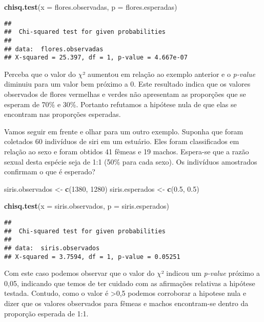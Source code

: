 \documentclass[14pt,titlepage, oneside, openany, a4paper]{book}
\newenvironment{Shaded}{\begin{snugshade}}{\end{snugshade}}
\newcommand{\DataTypeTok}[1]{\textcolor[rgb]{0.13,0.29,0.53}{#1}}
\newcommand{\DecValTok}[1]{\textcolor[rgb]{0.00,0.00,0.81}{#1}}
\newcommand{\FloatTok}[1]{\textcolor[rgb]{0.00,0.00,0.81}{#1}}
\newcommand{\KeywordTok}[1]{\textcolor[rgb]{0.13,0.29,0.53}{\textbf{#1}}}
\newcommand{\NormalTok}[1]{#1}
\newcommand{\StringTok}[1]{\textcolor[rgb]{0.31,0.60,0.02}{#1}}
\begin{document}
\begin{Shaded}
\begin{Highlighting}[]
\KeywordTok{chisq.test}\NormalTok{(}\DataTypeTok{x =}\NormalTok{ flores.observadas, }\DataTypeTok{p =}\NormalTok{ flores.esperadas)}
\end{Highlighting}
\end{Shaded}

\begin{verbatim}
## 
##  Chi-squared test for given probabilities
## 
## data:  flores.observadas
## X-squared = 25.397, df = 1, p-value = 4.667e-07
\end{verbatim}

Perceba que o valor do \(\chi\)² aumentou em relação ao exemplo anterior e o \emph{p-value} diminuiu para um valor bem próximo a 0. Este resultado indica que os valores observados de flores vermelhas e verdes não apresentam as proporções que se esperam de 70\% e 30\%. Portanto refutamos a hipótese nula de que elas se encontram nas proporções esperadas.

Vamos seguir em frente e olhar para um outro exemplo. Suponha que foram coletados 60 indivíduos de siri em um estuário. Eles foram classificados em relação ao sexo e foram obtidos 41 fêmeas e 19 machos. Espera-se que a razão sexual desta espécie seja de 1:1 (50\% para cada sexo). Os indivíduos amostrados confirmam o que é esperado?

\begin{Shaded}
\begin{Highlighting}[]
\NormalTok{siris.observados <-}\StringTok{ }\KeywordTok{c}\NormalTok{(}\DecValTok{1380}\NormalTok{, }\DecValTok{1280}\NormalTok{)}
\NormalTok{siris.esperados <-}\StringTok{ }\KeywordTok{c}\NormalTok{(}\FloatTok{0.5}\NormalTok{, }\FloatTok{0.5}\NormalTok{)}

\KeywordTok{chisq.test}\NormalTok{(}\DataTypeTok{x =}\NormalTok{ siris.observados, }\DataTypeTok{p =}\NormalTok{ siris.esperados)}
\end{Highlighting}
\end{Shaded}

\begin{verbatim}
## 
##  Chi-squared test for given probabilities
## 
## data:  siris.observados
## X-squared = 3.7594, df = 1, p-value = 0.05251
\end{verbatim}

Com este caso podemos observar que o valor do \(\chi\)² indicou um \emph{p-value} próximo a 0,05, indicando que temos de ter cuidado com as afirmações relativas a hipótese testada. Contudo, como o valor é \textgreater{}0,5 podemos corroborar a hipotese nula e dizer que os valores observados para fêmeas e machos encontram-se dentro da proporção esperada de 1:1.
\end{document}

